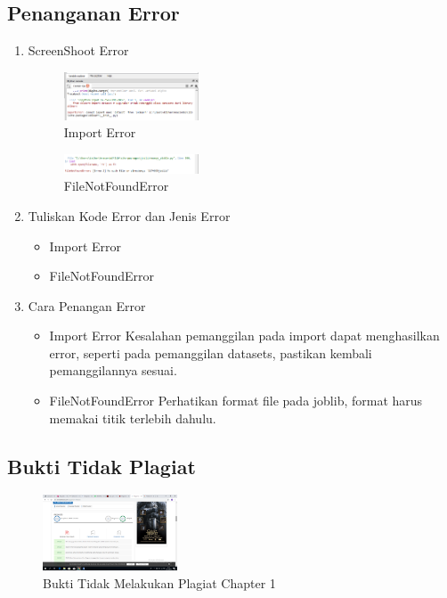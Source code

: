 \subsection{Penanganan Error}
\begin{enumerate}
	\item ScreenShoot Error
	\begin{figure}[H]
		\includegraphics[width=4cm]{figures/1174095/tugas1/error/1.PNG}
		\centering
		\caption{Import Error}
	\end{figure}
	\begin{figure}[H]
		\includegraphics[width=4cm]{figures/1174095/tugas1/error/2.PNG}
		\centering
		\caption{FileNotFoundError}
	\end{figure}
	\item Tuliskan Kode Error dan Jenis Error
	\begin{itemize}
		\item Import Error
		\item FileNotFoundError
	\end{itemize}
	\item Cara Penangan Error
	\begin{itemize}
		\item Import Error
		\hfill\break
		Kesalahan pemanggilan pada import dapat menghasilkan error, seperti pada pemanggilan datasets, pastikan kembali pemanggilannya sesuai.
		\item FileNotFoundError
		\hfill\break
		Perhatikan format file pada joblib, format harus memakai titik terlebih dahulu.
	\end{itemize}
\end{enumerate}
\subsection{Bukti Tidak Plagiat}
\begin{figure}[H]
	\includegraphics[width=4cm]{figures/1174095/tugas1/buktiplagiat/plag.png}
	\centering
	\caption{Bukti Tidak Melakukan Plagiat Chapter 1}
\end{figure}
